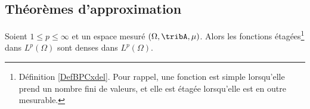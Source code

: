 \subsection{Théorèmes d'approximation}

\begin{proposition}      \label{PROPooUQUBooAWgNhm}
    Soient \( 1\leq p\leq\infty\) et un espace mesuré \( (\Omega,\tribA,\mu)\). Alors les fonctions étagées\footnote{Définition \ref{DefBPCxdel}. Pour rappel, une fonction est simple lorsqu'elle prend un nombre fini de valeurs, et elle est étagée lorsqu'elle est en outre mesurable.} dans \( L^p(\Omega)\) sont denses dans \( L^p(\Omega)\).
\end{proposition}


